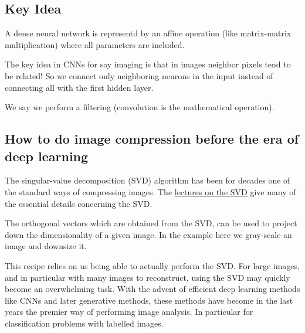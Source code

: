 \documentclass[%
oneside,                 %
final,                   %
10pt]{article}
\begin{document}
\subsection{Key Idea}

A dense neural network is representd by an affine operation (like matrix-matrix multiplication) where all parameters are included.

The key idea in CNNs for say imaging is that in images neighbor pixels tend to be related! So we connect
only neighboring neurons in the input instead of connecting all with the first hidden layer.

We say we perform a filtering (convolution is the mathematical operation). 

\subsection{How to do image compression before the era of deep learning}

The singular-value decomposition (SVD) algorithm has been for decades one of the standard ways of compressing images.
The \href{{https://compphysics.github.io/MachineLearning/doc/LectureNotes/_build/html/chapter2.html#the-singular-value-decomposition}}{lectures on the SVD} give many of the essential details concerning the SVD.

The orthogonal vectors which are obtained from the SVD, can be used to
project down the dimensionality of a given image. In the example here
we gray-scale an image and downsize it.

This recipe relies on us being able to actually perform the SVD. For
large images, and in particular with many images to reconstruct, using the SVD 
may quickly become an overwhelming task. With the advent of efficient deep
learning methods like CNNs and later generative methods, these methods
have become in the last years the premier way of performing image
analysis. In particular for classification problems with labelled images.

\end{document}
